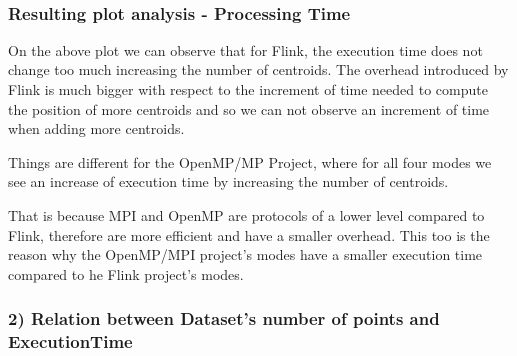 \documentclass[11pt]{article}
\begin{document}
    \begin{center}
    \end{center}
    { \hspace*{\fill} \\}
    
    \hypertarget{resulting-plot-analysis---processing-time}{%
\subsubsection{Resulting plot analysis - Processing
Time}\label{resulting-plot-analysis---processing-time}}

On the above plot we can observe that for Flink, the execution time does
not change too much increasing the number of centroids. The overhead
introduced by Flink is much bigger with respect to the increment of time
needed to compute the position of more centroids and so we can not
observe an increment of time when adding more centroids.

Things are different for the OpenMP/MP Project, where for all four modes
we see an increase of execution time by increasing the number of
centroids.

That is because MPI and OpenMP are protocols of a lower level compared
to Flink, therefore are more efficient and have a smaller overhead. This
too is the reason why the OpenMP/MPI project's modes have a smaller
execution time compared to he Flink project's modes.

    \hypertarget{relation-between-datasets-number-of-points-and-executiontime}{%
\subsubsection{2) Relation between Dataset's number of points and
ExecutionTime}\label{relation-between-datasets-number-of-points-and-executiontime}}
\end{document}
